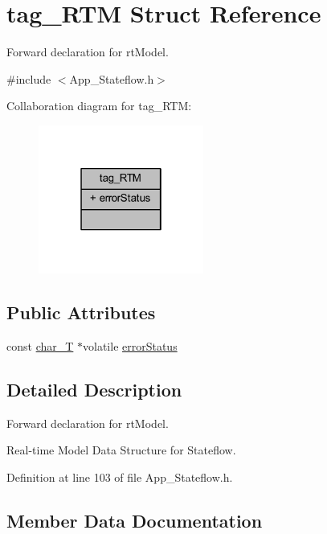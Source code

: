 \hypertarget{structtag___r_t_m}{}\section{tag\+\_\+\+R\+TM Struct Reference}
\label{structtag___r_t_m}


Forward declaration for rt\+Model.  




{\ttfamily \#include $<$App\+\_\+\+Stateflow.\+h$>$}



Collaboration diagram for tag\+\_\+\+R\+TM\+:
\nopagebreak
\begin{figure}[H]
\begin{center}
\leavevmode
\includegraphics[width=154pt]{structtag___r_t_m__coll__graph}
\end{center}
\end{figure}
\subsection*{Public Attributes}
\begin{DoxyCompactItemize}
\item 
const \mbox{\hyperlink{_app___stateflowtypes_8h_a0fd897430c65dad7d2638a12bc4ea8b5}{char\+\_\+T}} $\ast$volatile \mbox{\hyperlink{structtag___r_t_m_ad977c2bc0327f9acb30208f4dc6acffe}{error\+Status}}
\end{DoxyCompactItemize}


\subsection{Detailed Description}
Forward declaration for rt\+Model. 

Real-\/time Model Data Structure for Stateflow. 

Definition at line 103 of file App\+\_\+\+Stateflow.\+h.



\subsection{Member Data Documentation}
\mbox{\label{structtag___r_t_m_ad977c2bc0327f9acb30208f4dc6acffe}} 
